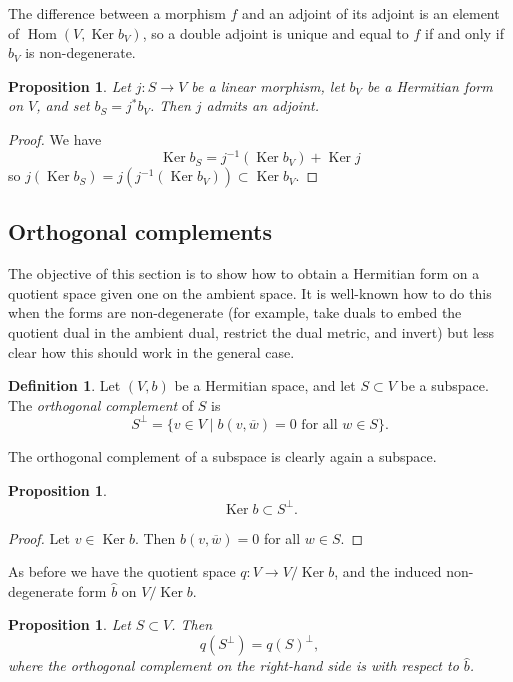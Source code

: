 \documentclass[10pt,a4paper]{amsart}
\newtheorem{prop}[theo]{Proposition}
\theoremstyle{definition}
\newtheorem{defi}[theo]{Definition}
\def\ov#1{\overline{#1}}
\DeclareMathOperator{\Ker}{Ker}
\DeclareMathOperator{\Hom}{Hom}
\begin{document}
The difference between a morphism $f$ and an adjoint of its adjoint is an element of $\Hom(V, \Ker b_V)$, so a double adjoint is unique and equal to $f$ if and only if $b_V$ is non-degenerate.


\begin{prop}
Let $j : S \to V$ be a linear morphism, let $b_V$ be a Hermitian form on $V$, and set $b_S = j^*b_V$. Then $j$ admits an adjoint.
\end{prop}

\begin{proof}
We have
\[
\Ker b_S = j^{-1}(\Ker b_V) + \Ker j
\]
so $j(\Ker b_S) = j(j^{-1}(\Ker b_V)) \subset \Ker b_V$.
\end{proof}






\subsection*{Orthogonal complements}


The objective of this section is to show how to obtain a Hermitian form on a quotient space given one on the ambient space. It is well-known how to do this when the forms are non-degenerate (for example, take duals to embed the quotient dual in the ambient dual, restrict the dual metric, and invert) but less clear how this should work in the general case.


\begin{defi}
Let $(V,b)$ be a Hermitian space, and let $S \subset V$ be a subspace. The \emph{orthogonal complement} of $S$ is
\[
S^\perp = \{ v \in V \mid b(v, \ov w) = 0 \text{ for all $w \in S$}\}.
\]
\end{defi}

The orthogonal complement of a subspace is clearly again a subspace.

\begin{prop}
\[
\Ker b \subset S^\perp.
\]
\end{prop}

\begin{proof}
Let $v \in \Ker b$. Then $b(v, \ov w) = 0$ for all $w \in S$.
\end{proof}


As before we have the quotient space $q : V \to V / \Ker b$, and the induced non-degenerate form $\hat b$ on $V / \Ker b$.

\begin{prop}
Let $S \subset V$. Then
\[
q(S^\perp) = q(S)^\perp,
\]
where the orthogonal complement on the right-hand side is with respect to $\hat b$.
\end{prop}
\end{document}
